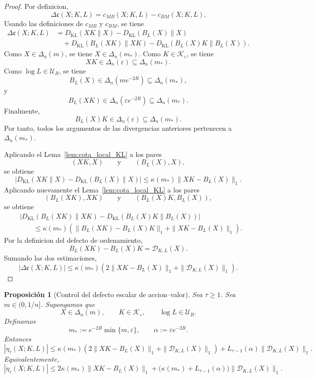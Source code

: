 ﻿\documentclass[12pt]{article}
\newtheorem{proposicion}{Proposición}[section]
\begin{document}
\begin{proof}
Por definicion,
\[
\Delta\mathfrak c(X;K,L)
=
c_{MB}(X;K,L)-c_{BM}(X;K,L).
\]
Usando las definiciones de \(c_{MB}\) y \(c_{BM}\), se tiene
\[
\begin{aligned}
\Delta\mathfrak c(X;K,L)
&=
D_{\mathrm{KL}}(XK\|X)
-
D_{\mathrm{KL}}(B_L(X)\|X)
\\
&\quad+
D_{\mathrm{KL}}(B_L(XK)\|XK)
-
D_{\mathrm{KL}}(B_L(X)K\|B_L(X)).
\end{aligned}
\]
Como \(X\in\Delta_n(m)\), se tiene \(X\in\Delta_n(m_*)\). Como \(K\in\mathcal K_\varepsilon\), se tiene
\[
XK\in\Delta_n(\varepsilon)\subseteq\Delta_n(m_*).
\]
Como \(\log L\in\mathcal U_R\), se tiene
\[
B_L(X)\in\Delta_n(me^{-2R})\subseteq\Delta_n(m_*),
\]
y
\[
B_L(XK)\in\Delta_n(\varepsilon e^{-2R})\subseteq\Delta_n(m_*).
\]
Finalmente,
\[
B_L(X)K\in\Delta_n(\varepsilon)\subseteq\Delta_n(m_*).
\]
Por tanto, todos los argumentos de las divergencias anteriores pertenecen a \(\Delta_n(m_*)\).

Aplicando el Lema~\ref{lem:cota_local_KL} a los pares
\[
(XK,X)
\qquad\text{y}\qquad
(B_L(X),X),
\]
se obtiene
\[
\left|
D_{\mathrm{KL}}(XK\|X)
-
D_{\mathrm{KL}}(B_L(X)\|X)
\right|
\le
\kappa(m_*)\|XK-B_L(X)\|_1.
\]
Aplicando nuevamente el Lema~\ref{lem:cota_local_KL} a los pares
\[
(B_L(XK),XK)
\qquad\text{y}\qquad
(B_L(X)K,B_L(X)),
\]
se obtiene
\[
\begin{aligned}
&
\left|
D_{\mathrm{KL}}(B_L(XK)\|XK)
-
D_{\mathrm{KL}}(B_L(X)K\|B_L(X))
\right|
\\
&\qquad
\le
\kappa(m_*)
\left(
\|B_L(XK)-B_L(X)K\|_1
+
\|XK-B_L(X)\|_1
\right).
\end{aligned}
\]
Por la definicion del defecto de ordenamiento,
\[
B_L(XK)-B_L(X)K
=
\mathcal D_{K,L}(X).
\]
Sumando las dos estimaciones,
\[
|\Delta\mathfrak c(X;K,L)|
\le
\kappa(m_*)
\left(
2\|XK-B_L(X)\|_1
+
\|\mathcal D_{K,L}(X)\|_1
\right).
\]
\end{proof}

\begin{proposicion}[Control del defecto escalar de accion--valor]\label{prop:control_defecto_escalar_accion_valor}
Sea \(\tau\ge 1\). Sea \(m\in(0,1/n]\). Supongamos que
\[
X\in\Delta_n(m),
\qquad
K\in\mathcal K_\varepsilon,
\qquad
\log L\in\mathcal U_R.
\]
Definamos
\[
m_*:=e^{-2R}\min\{m,\varepsilon\},
\qquad
\alpha:=\varepsilon e^{-2R}.
\]
Entonces
\[
|\eta_\tau(X;K,L)|
\le
\kappa(m_*)
\left(
2\|XK-B_L(X)\|_1
+
\|\mathcal D_{K,L}(X)\|_1
\right)
+
L_{\tau-1}(\alpha)\|\mathcal D_{K,L}(X)\|_1.
\]
Equivalentemente,
\[
|\eta_\tau(X;K,L)|
\le
2\kappa(m_*)\|XK-B_L(X)\|_1
+
\bigl(\kappa(m_*)+L_{\tau-1}(\alpha)\bigr)
\|\mathcal D_{K,L}(X)\|_1.
\]
\end{proposicion}
\end{document}
